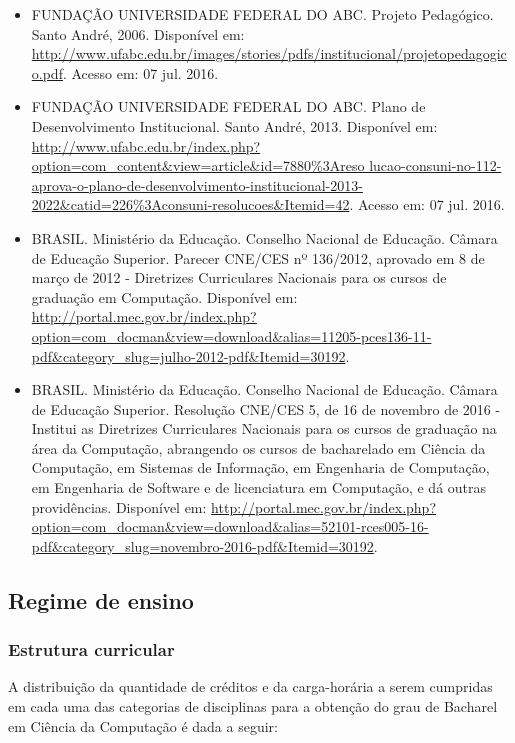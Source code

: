 \begin{itemize}
    \item FUNDAÇÃO UNIVERSIDADE FEDERAL DO ABC. Projeto Pedagógico. Santo
    André, 2006. Disponível em:
    \url{http://www.ufabc.edu.br/images/stories/pdfs/institucional/projetopedagogico.pdf}.
    Acesso em: 07 jul. 2016.
    
    \item FUNDAÇÃO UNIVERSIDADE FEDERAL DO ABC. Plano de Desenvolvimento
    Institucional. Santo André, 2013. Disponível em:
    \url{http://www.ufabc.edu.br/index.php?option=com_content&view=article&id=7880%
    lucao-consuni-no-112-aprova-o-plano-de-desenvolvimento-institucional-2013-
    2022&catid=226%
    
    \item BRASIL. Ministério da Educação. Conselho Nacional de Educação. Câmara
    de Educação Superior. Parecer CNE/CES nº 136/2012, aprovado em 8 de março
    de 2012 - Diretrizes Curriculares Nacionais para os cursos de graduação em
    Computação. Disponível em:
    \url{http://portal.mec.gov.br/index.php?option=com_docman&view=download&alias=11205-pces136-11-pdf&category_slug=julho-2012-pdf&Itemid=30192}.
    
    \item BRASIL. Ministério da Educação. Conselho Nacional de Educação. Câmara
    de Educação Superior. Resolução CNE/CES 5, de 16 de novembro de 2016 -
    Institui as Diretrizes Curriculares Nacionais para os cursos de graduação
    na área da Computação, abrangendo os cursos de bacharelado em Ciência da
    Computação, em Sistemas de Informação, em Engenharia de Computação, em
    Engenharia de Software e de licenciatura em Computação, e dá outras
    providências. Disponível em:
    \url{http://portal.mec.gov.br/index.php?option=com_docman&view=download&alias=52101-rces005-16-pdf&category_slug=novembro-2016-pdf&Itemid=30192}.
    
\end{itemize}


\subsection{Regime de ensino}

\subsubsection{Estrutura curricular}
A distribuição da quantidade de créditos e da carga-horária a serem cumpridas
em cada uma das categorias de disciplinas para a obtenção do grau de Bacharel
em Ciência da Computação é dada a seguir:

